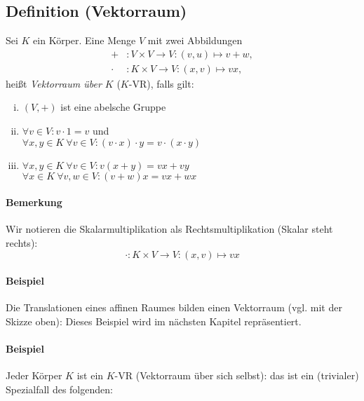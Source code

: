 \subsection{Definition (Vektorraum)}
	\begin{Definition}[Vektorraum]
		Sei $K$ ein Körper. Eine Menge $V$ mit zwei Abbildungen
	\begin{align*}
		 +&: V \times V \to V:(v,u)\mapsto v+w,\\
		 \cdot &: K \times V \to V:(x,v)\mapsto vx,
	\end{align*}
	heißt \emph{Vektorraum über $K$} ($K$-VR), falls gilt:
	\begin{enumerate}[(i)]
		\item $(V,+)$ ist eine abelsche Gruppe
		\item $\forall v\in V: v\cdot 1=v$ und\\
                      $\forall x,y \in K\ \forall v\in V: (v\cdot x)\cdot y = v\cdot (x\cdot y)$
		\item $\forall x,y \in K\ \forall v\in V: v(x+y) = vx + vy$\\
                      $\forall x\in K\ \forall v,w\in V: (v+w)x = vx + wx$
	\end{enumerate}
	\end{Definition}

\paragraph{Bemerkung}
	Wir notieren die Skalarmultiplikation als Rechtsmultiplikation (Skalar steht rechts):
		\[ \cdot: K \times V \to V : (x,v) \mapsto vx \]

\paragraph{Beispiel}
	Die Translationen eines affinen Raumes bilden einen Vektorraum (vgl. mit der Skizze oben): Dieses Beispiel wird im nächsten Kapitel repräsentiert.
	
\paragraph{Beispiel}
	Jeder Körper $ K $ ist ein $ K $-VR (Vektorraum über sich selbst): das ist ein (trivialer) Spezialfall des folgenden:
	
